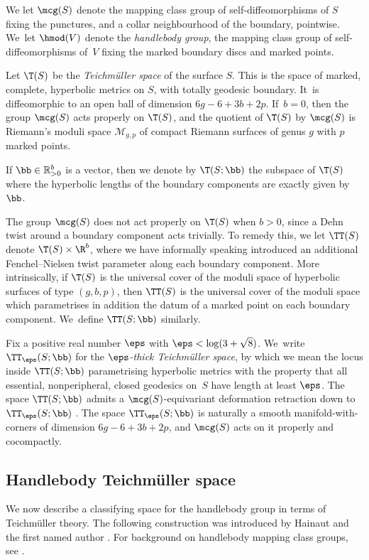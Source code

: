 We let $\mcg(S)$ denote the mapping class group of self-diffeomorphisms of $S$ fixing the punctures, and a collar neighbourhood of the boundary, pointwise. We~let $\hmod(V)$ denote the \emph{handlebody group}, \ie the mapping class group of self-diffeomorphisms of~$V$ fixing the marked boundary discs and marked points.

Let $\T(S)$ be the \emph{Teichmüller space} of the surface $S$. This is the space of marked, complete, hyperbolic metrics on $S$, with totally geodesic boundary. It~is diffeomorphic to an open ball of dimension $6g-6+3b+2p$. If~$b=0$, then the group $\mcg(S)$ acts properly on $\T(S)$, and the quotient of $\T(S)$ by $\mcg(S)$ is Riemann's moduli space $\mathcal M_{g,p}$ of compact Riemann surfaces of genus $g$ with $p$ marked points.

If $\bb \in \mathbb R^b_{>0}$ is a vector, then we denote by $\T(S;\bb)$ the subspace of $\T(S)$ where the hyperbolic lengths of the boundary components are exactly given by $\bb$.

The group $\mcg(S)$ does not act properly on $\T(S)$ when $b>0$, since a Dehn twist around a boundary component acts trivially. To remedy this, we let $\TT(S)$ denote $\T(S) \times \R^b$, where we have informally speaking introduced an additional Fenchel--Nielsen twist parameter along each boundary component. More intrinsically, if $\T(S)$ is the universal cover of the moduli space of hyperbolic surfaces of type $(g,b,p)$, then $\TT(S)$ is the universal cover of the moduli space which parametrises in addition the datum of a marked point on each boundary component. We~define $\TT(S;\bb)$ similarly.

Fix a positive real number $\eps$ with $\eps<\log(3+\sqrt 8)$. We~write $\TT_\eps(S;\bb)$ for the \emph{$\eps$-thick Teichmüller space}, by which we mean the locus inside $\TT(S;\bb)$ parametrising hyperbolic metrics with the property that all essential, nonperipheral, closed geodesics on~$S$ have length at least $\eps$. The space $\TT(S;\bb)$ admits a $\mcg(S)$-equivariant deformation retraction down to $\TT_\eps(S;\bb)$ \cite{jiwolpert}. The space $\TT_\eps(S;\bb)$ is naturally a smooth manifold-with-corners of dimension $6g-6+3b+2p$, and $\mcg(S)$ acts on it properly and cocompactly.

\subsection{Handlebody Teichmüller space}
We now describe a classifying space for the handlebody group in terms of Teichmüller theory. The following construction was introduced by Hainaut and the first named author \cite{hainautpetersen}. For background on handlebody mapping class groups, see \cite{hensel}.

